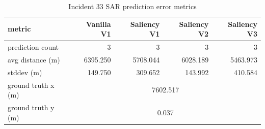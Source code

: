 \begin{table}[ht]
\centering
\caption{Incident 33 SAR prediction error metrics}
\label{tab:sar-incident-33}
\begin{tabular}{lrrrr}
\hline
metric & Vanilla V1 & Saliency V1 & Saliency V2 & Saliency V3 \\
\hline
prediction count & 3 & 3 & 3 & 3 \\
avg distance (m) & 6395.250 & 5708.044 & 6028.189 & 5463.973 \\
stddev (m) & 149.750 & 309.652 & 143.992 & 410.584 \\
ground truth x (m) & \multicolumn{4}{c}{7602.517} \\
ground truth y (m) & \multicolumn{4}{c}{0.037} \\
\hline
\end{tabular}
\end{table}
